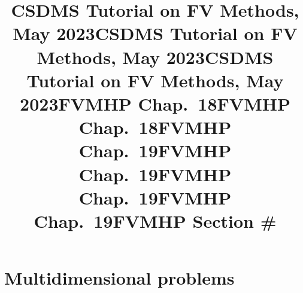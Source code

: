 \documentclass{beamer}
\newcommand{\mkslide}[1]{\title{CSDMS Tutorial on FV Methods, May 2023}
   }
\newcommand{\mkslidelabel}[2]{\title{#2}}
\begin{document}
\mkslide{tsunami/crossec-chile.be}
\mkslide{tsunami/transect-pwconst.be}
\mkslide{csdms2023/wbmethods1.be}

\section{Multidimensional problems}
\mkslidelabel{csdms2023/derive2d1.be}{FVMHP Chap.\ 18}
\mkslidelabel{fvm/derive2d2.be}{FVMHP Chap.\ 18}
\mkslidelabel{fvm/fv2d1.be}{FVMHP Chap.\ 19}
\mkslidelabel{fvm/fv2d2.be}{FVMHP Chap.\ 19}
\mkslidelabel{csdms2023/dimsplit1b.be}{FVMHP Chap.\ 19}
\mkslidelabel{fvm/splitvunsplit.be}{FVMHP Chap.\ 19}

\mkslidelabel{csdms2023/links.be}{FVMHP Section \#}
\end{document}
